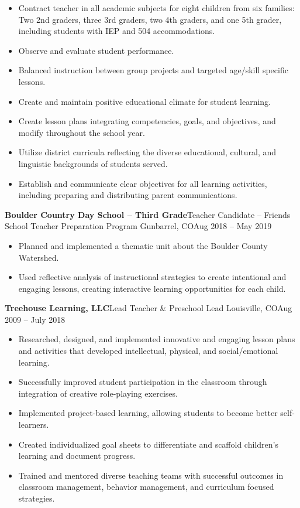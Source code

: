 \documentclass[letterpaper,10pt]{article}
\begin{document}
\begin{itemize}
    \item Contract teacher in all academic subjects for eight children from six families: Two 2nd graders, three 3rd graders, two 4th graders, and one 5th grader, including students with IEP and 504 accommodations.
    \item Observe and evaluate student performance.
    \item Balanced instruction between group projects and targeted age/skill specific lessons.
    \item Create and maintain positive educational climate for student learning.
    \item Create lesson plans integrating competencies, goals, and objectives, and modify throughout the school year.
    \item Utilize district curricula reflecting the diverse educational, cultural, and linguistic backgrounds of students served.
    \item Establish and communicate clear objectives for all learning activities, including preparing and distributing parent communications.
\end{itemize}


\vspace{1pc}
\textbf{Boulder Country Day School -- Third Grade}\hfill Teacher Candidate -- Friends School Teacher Preparation Program
\smallbreak Gunbarrel, CO\hfill Aug 2018 -- May 2019

\begin{itemize}
    \item Planned and implemented a thematic unit about the Boulder County Watershed.
    \item Used reflective analysis of instructional strategies to create intentional and engaging lessons, creating interactive learning opportunities for each child.
\end{itemize}


\vspace{1pc}
\textbf{Treehouse Learning, LLC}\hfill Lead Teacher \& Preschool Lead
\smallbreak Louisville, CO\hfill Aug 2009 -- July 2018

\begin{itemize}
    \item Researched, designed, and implemented innovative and engaging lesson plans and activities that developed intellectual, physical, and social/emotional learning.
    \item Successfully improved student participation in the classroom through integration of creative role-playing exercises.
    \item Implemented project-based learning, allowing students to become better self-learners.
    \item Created individualized goal sheets to differentiate and scaffold children's learning and document progress.
    \item Trained and mentored diverse teaching teams with successful outcomes in classroom management, behavior management, and curriculum focused strategies.
\end{itemize}
\end{document}
